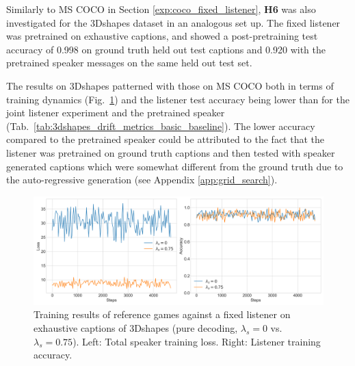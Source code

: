 Similarly to MS COCO in Section \ref{exp:coco_fixed_listener}, \textbf{H6} was also investigated for the 3Dshapes dataset in an analogous set up. The fixed listener was pretrained on exhaustive captions, and showed a post-pretraining test accuracy of 0.998 on ground truth held out test captions and 0.920 with the pretrained speaker messages on the same held out test set. 

The results on 3Dshapes patterned with those on MS COCO both in terms of training dynamics (Fig.~\ref{fig:3dshapes_fixed_listener_0_075_speaker_losses_listener_acc}) and the listener test accuracy being lower than for the joint listener experiment and the pretrained speaker (Tab.~\ref{tab:3dshapes_drift_metrics_basic_baseline}). The lower accuracy compared to the pretrained speaker could be attributed to the fact that the listener was pretrained on ground truth captions and then tested with speaker generated captions which were somewhat different from the ground truth due to the auto-regressive generation (see Appendix \ref{app:grid_search}).
\begin{figure}[h]
	\centering
	\includegraphics[width=\linewidth]{images/3dshapes_fixedListener_baseline_random_0_075_losses.png}
	\caption{Training results of reference games against a fixed listener on exhaustive captions of 3Dshapes (pure decoding, $\lambda_s=0$ vs. $\lambda_s=0.75$). Left: Total speaker training loss. Right: Listener training accuracy.}
	\label{fig:3dshapes_fixed_listener_0_075_speaker_losses_listener_acc}
\end{figure}

